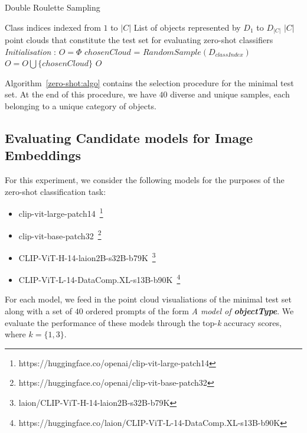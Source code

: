 \documentclass[letterpaper, 10 pt, conference]{ieeeconf}  %
\begin{document}
\begin{algorithm}
 \caption{Double Roulette Sampling}
 \begin{algorithmic}[1]
 \renewcommand{\algorithmicrequire}{\textbf{Input:}}
 \renewcommand{\algorithmicensure}{\textbf{Output:}}
 \REQUIRE Class indices indexed from $1$ to $|C|$
 \REQUIRE List of objects represented by $D_{1}$ to $D_{|C|}$
 \ENSURE  $|C|$ point clouds that constitute the test set for evaluating zero-shot classifiers
 \\ \textit{Initialisation} :
  \STATE $O = \Phi$
    \STATE $chosenCloud$ = $RandomSample(D_{classIndex})$
    \STATE $O = O \bigcup \{chosenCloud\}$
\ENDFOR
 \RETURN $O$ 
 \end{algorithmic} 
 \label{zero-shot:algo}
 \end{algorithm}

Algorithm~\ref{zero-shot:algo} contains the selection procedure for the minimal test set. At the end of this procedure, we have $40$ diverse and unique samples, each belonging to a unique category of objects.

\subsection{Evaluating Candidate models for Image Embeddings}
\label{zero-shot:candidates}
For this experiment, we consider the following models for the purposes of the zero-shot classification task:
\begin{itemize}
    \item clip-vit-large-patch14~\footnote{https://huggingface.co/openai/clip-vit-large-patch14}
    \item clip-vit-base-patch32~\footnote{https://huggingface.co/openai/clip-vit-base-patch32}
    \item CLIP-ViT-H-14-laion2B-s32B-b79K~\footnote{laion/CLIP-ViT-H-14-laion2B-s32B-b79K}
    \item CLIP-ViT-L-14-DataComp.XL-s13B-b90K~\footnote{https://huggingface.co/laion/CLIP-ViT-L-14-DataComp.XL-s13B-b90K}
\end{itemize}
For each model, we feed in the point cloud visualiations of the minimal test set along with a set of $40$ ordered prompts of the form \textit{A model of \textbf{objectType}}. We evaluate the performance of these models through the top-\textit{k} accuracy scores, where $k = \{1, 3\}$.
\end{document}
